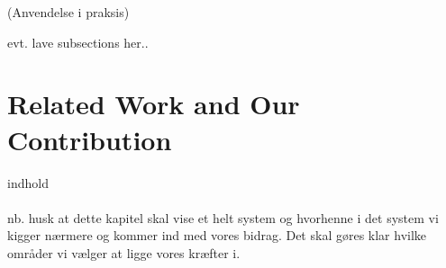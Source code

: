 (Anvendelse i praksis)

evt. lave subsections her..

\section{Related Work and Our Contribution } 
indhold
\\
\\
nb. husk at dette kapitel skal vise et helt system og hvorhenne i det system vi kigger nærmere og kommer ind med vores bidrag. Det skal gøres klar hvilke områder vi vælger at ligge vores kræfter i.  





 
